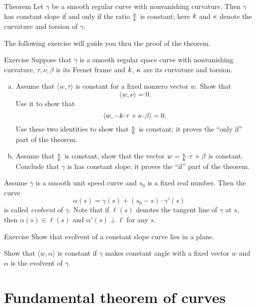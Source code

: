 \begin{thm}{Theorem}
Let $\gamma$ be a smooth regular curve with nonvanishing curvature.
Then $\gamma$ has constant slope if and only if the ratio $\tfrac{\kappa}{k}$ is constant; here $k$ and $\kappa$
denote the curvature and torsion of $\gamma$.
\end{thm}

The following exercise will guide you thru the proof of the theorem. 

\begin{thm}{Exercise} \label{ex:lancret}
Suppose that $\gamma$ is a smooth regular space curve with nonvanishing curvature, $\tau,\nu,\beta$ 
is its Frenet frame and $k$, $\kappa$ are its curvature and torsion.
\begin{enumerate}[(a)]
\item\label{ex:lancret:a} 
Assume that  $\langle w,\tau\rangle$ is constant for a fixed nonzero vector $w$.
Show that 
\[\langle w, \nu\rangle =0.\]
Use it to show that 
\[\langle w, -\kur\cdot\tau+\tor\cdot \beta\rangle =0.\]
Use these two identities to show that $\tfrac{\kappa}{k}$ is constant;
it proves the ``only if'' part of the theorem.

\item Assume that $\tfrac{\kappa}{k}$ is constant, show that the vector $w=\tfrac\tor\kur\cdot \tau+\beta$ is constant.
Conclude that $\gamma$ is has constant slope; it proves the ``if'' part of the theorem.
\end{enumerate}
\end{thm}

Assume $\gamma$ is a smooth unit speed curve and $s_0$ is a fixed real number.
Then the curve 
\[\alpha(s)=\gamma(s)+(s_0-s)\cdot \gamma'(s)\]
is called \emph{evolvent} of $\gamma$.
Note that if $\ell(s)$ denotes the tangent line of $\gamma$ at $s$,
then $\alpha(s)\in \ell(s)$ and $\alpha'(s)\perp \ell$ for any $s$.

\begin{thm}{Exercise} 
Show that evolvent of a constant slope curve lies in a plane.
\end{thm}

Show that $\langle w,\alpha\rangle$ is constant if $\gamma$ makes constant angle with a fixed vector $w$ and $\alpha$ is the evolvent of $\gamma$.
 
\section*{Fundamental theorem of curves}

